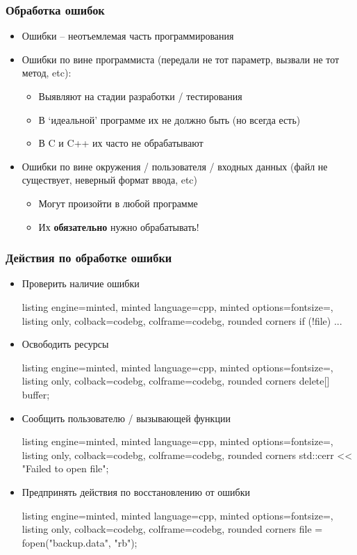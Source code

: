 \documentclass[10pt]{beamer}
\begin{document}
\begin{frame}[fragile]
\frametitle{Обработка ошибок}
\begin{itemize}
\item Ошибки -- неотъемлемая часть программирования
\pause
\item Ошибки по вине программиста (передали не тот параметр, вызвали не тот метод, etc):
\pause
\begin{itemize}
\item Выявляют на стадии разработки / тестирования
\pause
\item В `идеальной' программе их не должно быть (но всегда есть)
\pause
\item В C и C++ их часто не обрабатывают
\end{itemize}
\pause
\item Ошибки по вине окружения / пользователя / входных данных (файл не существует, неверный формат ввода, etc)
\pause
\begin{itemize}
\item Могут произойти в любой программе
\pause
\item Их \textbf{обязательно} нужно обрабатывать!
\end{itemize}
\end{itemize}
\end{frame}

\begin{frame}[fragile]
\frametitle{Действия по обработке ошибки}
\begin{itemize}
\item Проверить наличие ошибки
\begin{tcblisting}{listing engine=minted, minted language=cpp, minted options={fontsize=\scriptsize}, listing only, colback=codebg, colframe=codebg, rounded corners}
if (!file) { ... }
\end{tcblisting}
\pause
\item Освободить ресурсы
\begin{tcblisting}{listing engine=minted, minted language=cpp, minted options={fontsize=\scriptsize}, listing only, colback=codebg, colframe=codebg, rounded corners}
delete[] buffer;
\end{tcblisting}
\pause
\item Сообщить пользователю / вызывающей функции
\begin{tcblisting}{listing engine=minted, minted language=cpp, minted options={fontsize=\scriptsize}, listing only, colback=codebg, colframe=codebg, rounded corners}
std::cerr << "Failed to open file\n";
\end{tcblisting}
\pause
\item Предпринять действия по восстановлению от ошибки
\begin{tcblisting}{listing engine=minted, minted language=cpp, minted options={fontsize=\scriptsize}, listing only, colback=codebg, colframe=codebg, rounded corners}
file = fopen("backup.data", "rb");
\end{tcblisting}
\end{itemize}
\end{frame}
\end{document}
